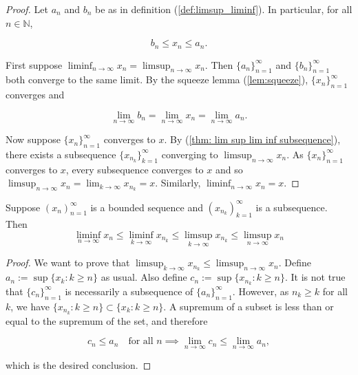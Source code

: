 \documentclass[../main.tex]{subfiles}
\begin{document}
    \begin{proof}
        Let $a_n$ and $b_n$ be as in definition (\ref{def:limsup_liminf}). In particular, for all $n \in \mathbb{N}$,

\[
b_n \leq x_n \leq a_n.
\]

First suppose $\liminf_{n \to \infty} x_n = \limsup_{n \to \infty} x_n$. Then $\{a_n\}_{n=1}^{\infty}$ and $\{b_n\}_{n=1}^{\infty}$ both converge to the same limit. By the squeeze lemma (\ref{lem:squeeze}), $\{x_n\}_{n=1}^{\infty}$ converges and

\[
\lim_{n \to \infty} b_n = \lim_{n \to \infty} x_n = \lim_{n \to \infty} a_n.
\]

Now suppose $\{x_n\}_{n=1}^{\infty}$ converges to $x$. By (\ref{thm: lim sup lim inf subsequence}), there exists a subsequence $\{x_{n_k}\}_{k=1}^{\infty}$ converging to $\limsup_{n \to \infty} x_n$. As $\{x_n\}_{n=1}^{\infty}$ converges to $x$, every subsequence converges to $x$ and so $\limsup_{n \to \infty} x_n = \lim_{k \to \infty} x_{n_k} = x$. Similarly, $\liminf_{n \to \infty} x_n = x$.
    \end{proof}
    
    
    
    
    
    
    \begin{exercise}
    Suppose $ (x_n)^\infty_{n=1}$ is a bounded sequence and $ (x_{n_k})^\infty_{k = 1}$ is a subsequence. Then
    \[
    \liminf_{n \to \infty} x_n \leq \liminf_{k \to \infty} x_{n_k} \leq \limsup_{k \to \infty} x_{n_k} \leq \limsup_{n \to \infty} x_n
    \]
    \end{exercise}
    
    
    \begin{proof}

We want to prove that $\limsup_{k \to \infty} x_{n_k} \leq \limsup_{n \to \infty} x_n$. Define $a_n := \sup\{x_k : k \geq n\}$ as usual. Also define $c_n := \sup\{x_{n_k} : k \geq n\}$. It is not true that $\{c_n\}_{n=1}^{\infty}$ is necessarily a subsequence of $\{a_n\}_{n=1}^{\infty}$. However, as $n_k \geq k$ for all $k$, we have $\{x_{n_k} : k \geq n\} \subset \{x_k : k \geq n\}$. A supremum of a subset is less than or equal to the supremum of the set, and therefore

\[
c_n \leq a_n \quad \text{for all } n
\implies \lim_{n \to \infty} c_n \leq \lim_{n \to \infty} a_n,
\]

which is the desired conclusion.
    \end{proof}
    
\end{document}
